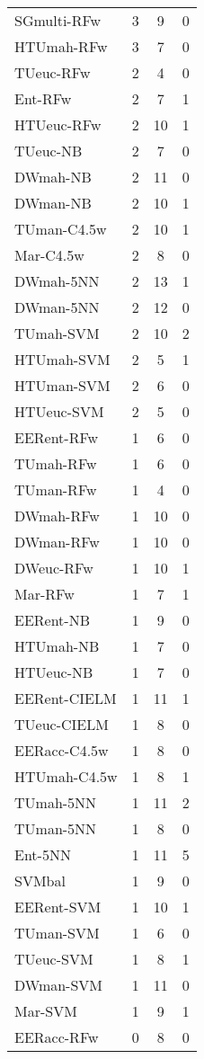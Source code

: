 \begin{table}[h]
\begin{center}
{\begin{tabular}{lccc}
SGmulti-RFw & 3 & 9 & 0 \\
HTUmah-RFw & 3 & 7 & 0 \\
TUeuc-RFw  & 2 & 4 & 0 \\
Ent-RFw    & 2 & 7 & 1 \\
HTUeuc-RFw & 2 & 10 & 1 \\
TUeuc-NB   & 2 & 7 & 0 \\
DWmah-NB   & 2 & 11 & 0 \\
DWman-NB   & 2 & 10 & 1 \\
TUman-C4.5w & 2 & 10 & 1 \\
Mar-C4.5w  & 2 & 8 & 0 \\
DWmah-5NN  & 2 & 13 & 1 \\
DWman-5NN  & 2 & 12 & 0 \\
TUmah-SVM  & 2 & 10 & 2 \\
HTUmah-SVM & 2 & 5 & 1 \\
HTUman-SVM & 2 & 6 & 0 \\
HTUeuc-SVM & 2 & 5 & 0 \\
EERent-RFw & 1 & 6 & 0 \\
TUmah-RFw  & 1 & 6 & 0 \\
TUman-RFw  & 1 & 4 & 0 \\
DWmah-RFw  & 1 & 10 & 0 \\
DWman-RFw  & 1 & 10 & 0 \\
DWeuc-RFw  & 1 & 10 & 1 \\
Mar-RFw    & 1 & 7 & 1 \\
EERent-NB  & 1 & 9 & 0 \\
HTUmah-NB  & 1 & 7 & 0 \\
HTUeuc-NB  & 1 & 7 & 0 \\
EERent-CIELM & 1 & 11 & 1 \\
TUeuc-CIELM & 1 & 8 & 0 \\
EERacc-C4.5w & 1 & 8 & 0 \\
HTUmah-C4.5w & 1 & 8 & 1 \\
TUmah-5NN  & 1 & 11 & 2 \\
TUman-5NN  & 1 & 8 & 0 \\
Ent-5NN    & 1 & 11 & 5 \\
SVMbal     & 1 & 9 & 0 \\
EERent-SVM & 1 & 10 & 1 \\
TUman-SVM  & 1 & 6 & 0 \\
TUeuc-SVM  & 1 & 8 & 1 \\
DWman-SVM  & 1 & 11 & 0 \\
Mar-SVM    & 1 & 9 & 1 \\
EERacc-RFw & 0 & 8 & 0 \\

\end{tabular}}
\end{center}
\end{table}
